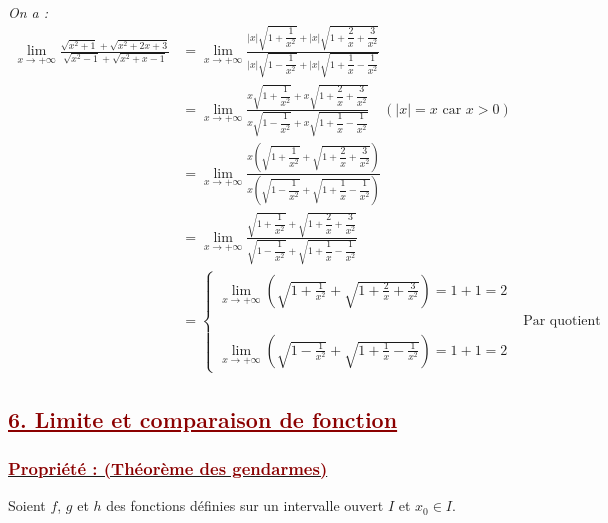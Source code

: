 \documentclass[12pt,a4paper]{article}
\begin{document}
\begin{enumerate}
    \textit{On a :}
    \begin{align*}
        \displaystyle \lim_{x \to +\infty} \frac{\sqrt{x^2 + 1} + \sqrt{x^2 + 2x + 3}}{\sqrt{x^2 - 1} + \sqrt{x^2 + x - 1}} &= \lim_{x \to +\infty} \frac{|x|\sqrt{1 + \dfrac{1}{x^2}} + |x|\sqrt{1 + \dfrac{2}{x} + \dfrac{3}{x^2}}}{|x|\sqrt{1 - \dfrac{1}{x^2}} + |x|\sqrt{1 + \dfrac{1}{x} - \dfrac{1}{x^2}}} \\
        &= \lim_{x \to +\infty} \frac{x\sqrt{1 + \dfrac{1}{x^2}} + x\sqrt{1 + \dfrac{2}{x} + \dfrac{3}{x^2}}}{x\sqrt{1 - \dfrac{1}{x^2}} + x\sqrt{1 + \dfrac{1}{x} - \dfrac{1}{x^2}}} \quad (|x| = x \text{ car } x > 0) \\
        &= \lim_{x \to +\infty} \frac{x\left(\sqrt{1 + \dfrac{1}{x^2}} + \sqrt{1 + \dfrac{2}{x} + \dfrac{3}{x^2}}\right)}{x\left(\sqrt{1 - \dfrac{1}{x^2}} + \sqrt{1 + \dfrac{1}{x} - \dfrac{1}{x^2}}\right)} \\
        &= \lim_{x \to +\infty} \frac{\sqrt{1 + \dfrac{1}{x^2}} + \sqrt{1 + \dfrac{2}{x} + \dfrac{3}{x^2}}}{\sqrt{1 - \dfrac{1}{x^2}} + \sqrt{1 + \dfrac{1}{x} - \dfrac{1}{x^2}}} \\
        &= \begin{cases}
    \displaystyle \lim_{x \to +\infty} \left(\sqrt{1 + \frac{1}{x^2}} + \sqrt{1 + \frac{2}{x} + \frac{3}{x^2}}\right) = 1 + 1 = 2 \\[3mm]
    &\text{ Par quotient }\\
    \displaystyle \lim_{x \to +\infty} \left(\sqrt{1 - \frac{1}{x^2}} + \sqrt{1 + \frac{1}{x} - \frac{1}{x^2}}\right) = 1 + 1 = 2
    \end{cases}
    \end{align*}
    
    \vspace{0.2cm}
    
     
\end{enumerate}
\subsection*{\textcolor{darkred}{\underline{6. Limite et comparaison de fonction}}}
\subsubsection*{\underline{\textcolor{darkred}{ Propriété : (Théorème des gendarmes) }}}
Soient $f$, $g$ et $h$ des fonctions définies sur un intervalle ouvert $I$ et $x_0 \in I$.
\end{document}
